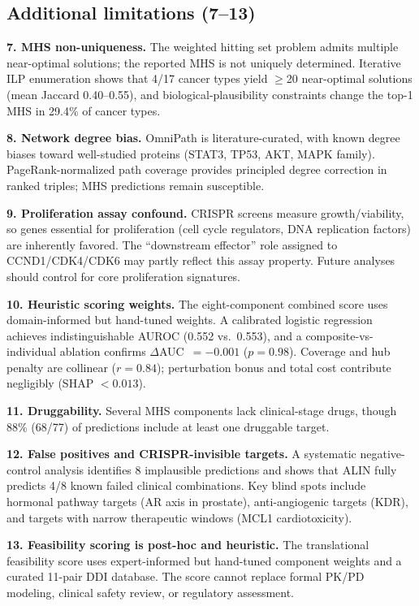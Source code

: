 \documentclass[11pt]{article}
\begin{document}
\subsection{Additional limitations (7--13)}
\label{sec:additional_limitations}

\textbf{7. MHS non-uniqueness.} The weighted hitting set problem admits multiple near-optimal solutions; the reported MHS is not uniquely determined. Iterative ILP enumeration shows that 4/17 cancer types yield $\geq$20 near-optimal solutions (mean Jaccard 0.40--0.55), and biological-plausibility constraints change the top-1 MHS in 29.4\% of cancer types.

\textbf{8. Network degree bias.} OmniPath is literature-curated, with known degree biases toward well-studied proteins (STAT3, TP53, AKT, MAPK family). PageRank-normalized path coverage provides principled degree correction in ranked triples; MHS predictions remain susceptible.

\textbf{9. Proliferation assay confound.} CRISPR screens measure growth/viability, so genes essential for proliferation (cell cycle regulators, DNA replication factors) are inherently favored. The ``downstream effector'' role assigned to CCND1/CDK4/CDK6 may partly reflect this assay property. Future analyses should control for core proliferation signatures.

\textbf{10. Heuristic scoring weights.} The eight-component combined score uses domain-informed but hand-tuned weights. A calibrated logistic regression achieves indistinguishable AUROC (0.552 vs.\ 0.553), and a composite-vs-individual ablation confirms $\Delta$AUC~$= -0.001$ ($p = 0.98$). Coverage and hub penalty are collinear ($r = 0.84$); perturbation bonus and total cost contribute negligibly (SHAP $< 0.013$).

\textbf{11. Druggability.} Several MHS components lack clinical-stage drugs, though 88\% (68/77) of predictions include at least one druggable target.

\textbf{12. False positives and CRISPR-invisible targets.} A systematic negative-control analysis identifies 8 implausible predictions and shows that ALIN fully predicts 4/8 known failed clinical combinations. Key blind spots include hormonal pathway targets (AR axis in prostate), anti-angiogenic targets (KDR), and targets with narrow therapeutic windows (MCL1 cardiotoxicity).

\textbf{13. Feasibility scoring is post-hoc and heuristic.} The translational feasibility score uses expert-informed but hand-tuned component weights and a curated 11-pair DDI database. The score cannot replace formal PK/PD modeling, clinical safety review, or regulatory assessment.
\end{document}
